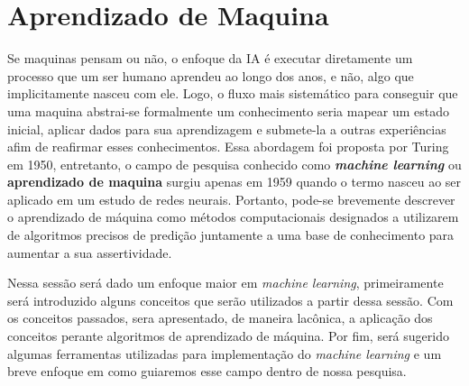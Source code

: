 \section{Aprendizado de Maquina}
Se maquinas pensam ou não, o enfoque da IA é executar diretamente um processo que um ser humano aprendeu ao longo dos anos, e não, algo que implicitamente nasceu com ele. Logo, o fluxo mais sistemático para conseguir que uma maquina abstrai-se formalmente um conhecimento seria mapear um estado inicial, aplicar dados para sua aprendizagem e submete-la a outras experiências afim de reafirmar esses conhecimentos. Essa abordagem foi proposta por Turing em 1950, entretanto, o campo de pesquisa conhecido como \textit{\textbf{machine learning}} ou \textbf{aprendizado de maquina} surgiu apenas em 1959 quando o termo nasceu ao ser aplicado em um estudo de redes neurais. Portanto, pode-se brevemente descrever o aprendizado de máquina como métodos computacionais designados a utilizarem de algoritmos precisos de predição juntamente a uma base de conhecimento para aumentar a sua assertividade\cite[1]{turing1950, samuel1959some, mohri2012foundations}.

Nessa sessão será dado um enfoque maior em \textit{machine learning}, primeiramente será introduzido alguns conceitos que serão utilizados a partir dessa sessão. Com os conceitos passados, sera apresentado, de maneira lacônica, a aplicação dos conceitos perante algoritmos de aprendizado de máquina. Por fim, será sugerido algumas ferramentas utilizadas para implementação do \textit{machine learning} e um breve enfoque em como guiaremos esse campo dentro de nossa pesquisa.



